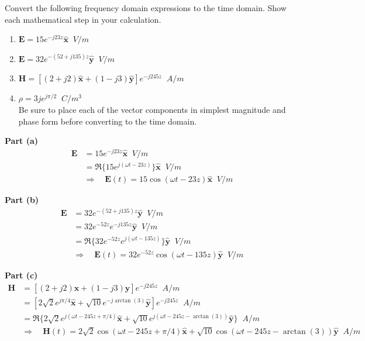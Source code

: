 \documentclass[11pt]{article}
\begin{document}
\pagebreak

\begin{homeworkProblem}

Convert the following frequency domain expressions to the time domain. Show each mathematical step in your calculation.

\begin{enumerate}[label=(\alph*), topsep=5pt, itemsep=0pt]
    \item $\mathbf{E} = 15 e^{-j 23 z} \hat{\mathbf{x}} \;\; \unit{V/m}$
    \item $\mathbf{E} = 32 e^{-(52 + j 135) z} \hat{\mathbf{y}} \;\; \unit{V/m}$
    \item $\mathbf{H} = [(2 + j2) \hat{\mathbf{x}} + (1 - j 3) \hat{\mathbf{y}}] e^{-j 245 z} \;\; \unit{A/m}$
    \item $\rho = 3 j e^{j\pi/2} \;\; \unit{C/m^3}$ \\
    Be sure to place each of the vector components in simplest magnitude and phase form before
    converting to the time domain.
\end{enumerate} \vspace{1\baselineskip}

\solution

\textbf{Part (a)}
\begin{align*}
    \mathbf{E} &= 15 e^{-j 23 z} \hat{\mathbf{x}} \;\; \unit{V/m} \\
    &= \Re \{15 e^{j(\omega t - 23 z)}\} \hat{\mathbf{x}} \;\; \unit{V/m} \\
    &\Rightarrow \quad \mathbf{E}(t) = 15 \cos (\omega t - 23 z) \hat{\mathbf{x}} \;\; \unit{V/m}
\end{align*}

\textbf{Part (b)}
\begin{align*}
    \mathbf{E} &= 32 e^{-(52 + j 135) z
} \hat{\mathbf{y}} \;\; \unit{V/m} \\
    &= 32 e^{-52 z} e^{-j 135 z} \hat{\mathbf{y}} \;\; \unit{V/m} \\
    &= \Re \{32 e^{-52 z} e^{j(\omega t - 135 z)}\} \hat{\mathbf{y}} \;\; \unit{V/m} \\
    &\Rightarrow \quad \mathbf{E}(t) = 32 e^{-  52 z} \cos (\omega t - 135 z) \hat{\mathbf{y}} \;\; \unit{V/m}
\end{align*}

\textbf{Part (c)}
\begin{align*}
    \mathbf{H} &= [(2 + j2) \hat{\mathbf{x}} + (1 - j 3) \hat{\mathbf{y}}] e^{-j 245 z} \;\; \unit{A/m} \\
    &= [2\sqrt{2} e^{j \pi/4} \hat{\mathbf{x}} + \sqrt{10} e^{-j \arctan(3)} \hat{\mathbf{y}}] e^{-j 245 z} \;\; \unit{A/m} \\
    &= \Re \{2\sqrt{2} e^{j(\omega t - 245 z + \pi/4)} \hat{\mathbf{x}} + \sqrt{10} e^{j(\omega t - 245 z - \arctan(3))} \hat{\mathbf{y}}\} \;\; \unit{A/m} \\
    &\Rightarrow \quad \mathbf{H}(t) = 2\sqrt{2} \cos (\omega t - 245 z + \pi/4) \hat{\mathbf{x}} + \sqrt{10} \cos (\omega t - 245 z - \arctan(3)) \hat{\mathbf{y}} \;\; \unit{A/m}
\end{align*}


\end{homeworkProblem}
\end{document}
